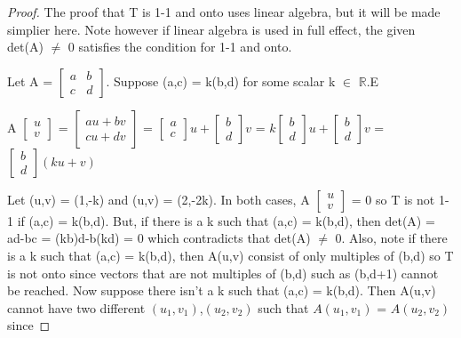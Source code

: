     \begin{proof}
        The proof that T is 1-1 and onto uses linear algebra,
        but it will be made simplier here.
        Note however if linear algebra is used in full effect,
        the given det(A) $\not =$ 0 satisfies the condition for 1-1 and onto.

        Let A =
        $
        \begin{bmatrix}
            a & b \\
            c & d
        \end{bmatrix}
        $.
        Suppose (a,c) = k(b,d) for some scalar k $\in$ $\mathbb{R}$.E

        \hspace{0.5cm}
        A $
        \begin{bmatrix}
            u \\
            v
        \end{bmatrix}
        $ =
        $
        \begin{bmatrix}
            au + bv \\
            cu + dv
        \end{bmatrix}
        $ =
        $
        \begin{bmatrix}
            a \\
            c
        \end{bmatrix}u
        +
        \begin{bmatrix}
            b \\
            d
        \end{bmatrix}v
        $ =
        $
        k
        \begin{bmatrix}
            b \\
            d
        \end{bmatrix}u
        +
        \begin{bmatrix}
            b \\
            d
        \end{bmatrix}v
        $ =
        $
        \begin{bmatrix}
            b \\
            d
        \end{bmatrix}(ku+v)
        $

        Let (u,v) = (1,-k) and (u,v) = (2,-2k).
        In both cases,
        A $
        \begin{bmatrix}
            u \\
            v
        \end{bmatrix}
        $ = 0
        so T is not 1-1 if (a,c) = k(b,d).
        But, if there is a k such that (a,c) = k(b,d),
        then det(A) = ad-bc = (kb)d-b(kd) = 0
        which contradicts that det(A) $\not =$ 0.
        Also, note if there is a k such that (a,c) = k(b,d),
        then A(u,v) consist of only multiples of (b,d)
        so T is not onto since vectors that are not multiples of
        (b,d) such as (b,d+1) cannot be reached.
        Now suppose there isn't a k such that (a,c) = k(b,d). Then A(u,v)
        cannot have two different $(u_1,v_1)$,$(u_2,v_2)$
        such that $A(u_1,v_1)$ = $A(u_2,v_2)$
        since 


\end{proof}
